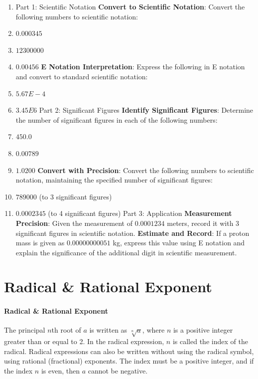 \begin{enumerate}
    \item Part 1: Scientific Notation \textbf{Convert to Scientific Notation}: Convert the following numbers to scientific notation:
    \item $0.000345$
    \item $12300000$
    \item $0.00456$ \textbf{E Notation Interpretation}: Express the following in E notation and convert to standard scientific notation:
    \item $5.67E-4$
    \item $3.45E6$ Part 2: Significant Figures \textbf{Identify Significant Figures}: Determine the number of significant figures in each of the following numbers:
    \item $450.0$
    \item $0.00789$
    \item $1.0200$ \textbf{Convert with Precision}: Convert the following numbers to scientific notation, maintaining the specified number of significant figures:
    \item $789000$ (to 3 significant figures)
    \item $0.0002345$ (to 4 significant figures) Part 3: Application \textbf{Measurement Precision}: Given the measurement of $0.0001234$ meters, record it with 3 significant figures in scientific notation. \textbf{Estimate and Record}: If a proton mass is given as $0.00000000051$ kg, express this value using E notation and explain the significance of the additional digit in scientific measurement.
\end{enumerate}

\section{Radical \& Rational Exponent}
\label{sec:radical-rational-exponent}

\paragraph{Radical \& Rational Exponent}

The principal $n$th root of $a$ is written as $\sqrt[n]{a}$, where $n$ is a positive integer greater than or equal to 2. In the radical expression, $n$ is called the index of the radical. Radical expressions can also be written without using the radical symbol, using rational (fractional) exponents. The index must be a positive integer, and if the index $n$ is even, then $a$ cannot be negative.

